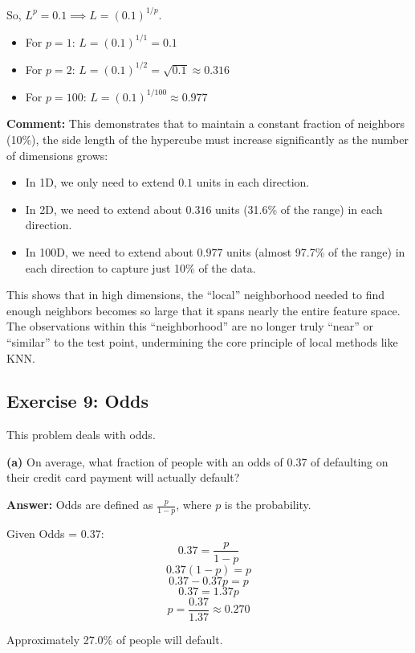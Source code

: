\documentclass[
]{article}
\providecommand{\tightlist}{%
  \setlength{\itemsep}{0pt}\setlength{\parskip}{0pt}}
\begin{document}
So, \(L^p = 0.1 \implies L = (0.1)^{1/p}\).

\begin{itemize}
\tightlist
\item
  For \(p = 1\): \(L = (0.1)^{1/1} = \mathbf{0.1}\)
\item
  For \(p = 2\): \(L = (0.1)^{1/2} = \sqrt{0.1} \approx \mathbf{0.316}\)
\item
  For \(p = 100\): \(L = (0.1)^{1/100} \approx \mathbf{0.977}\)
\end{itemize}

\textbf{Comment:} This demonstrates that to maintain a constant fraction
of neighbors (10\%), the side length of the hypercube must increase
significantly as the number of dimensions grows:

\begin{itemize}
\tightlist
\item
  In 1D, we only need to extend \(0.1\) units in each direction.
\item
  In 2D, we need to extend about \(0.316\) units (31.6\% of the range)
  in each direction.
\item
  In 100D, we need to extend about \(0.977\) units (almost 97.7\% of the
  range) in each direction to capture just 10\% of the data.
\end{itemize}

This shows that in high dimensions, the ``local'' neighborhood needed to
find enough neighbors becomes so large that it spans nearly the entire
feature space. The observations within this ``neighborhood'' are no
longer truly ``near'' or ``similar'' to the test point, undermining the
core principle of local methods like KNN.

\subsection{Exercise 9: Odds}\label{exercise-9-odds}

This problem deals with odds.

\textbf{(a)} On average, what fraction of people with an odds of 0.37 of
defaulting on their credit card payment will actually default?

\textbf{Answer:} Odds are defined as \(\frac{p}{1-p}\), where \(p\) is
the probability.

Given Odds = 0.37: \[0.37 = \frac{p}{1-p}\] \[0.37(1-p) = p\]
\[0.37 - 0.37p = p\] \[0.37 = 1.37p\]
\[p = \frac{0.37}{1.37} \approx \mathbf{0.270}\]

Approximately 27.0\% of people will default.
\end{document}
